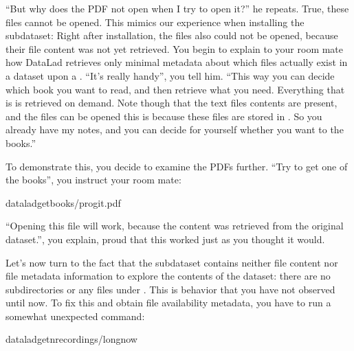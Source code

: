 \ignorespaces 
\sphinxAtStartPar
“But why does the PDF not open when I try to open it?” he repeats.
True, these files cannot be opened. This mimics our experience when
installing the  subdataset: Right after installation,
the  files also could not be opened, because their file
content was not yet retrieved. You begin to explain to your room mate
how DataLad retrieves only minimal metadata about which files actually
exist in a dataset upon a . “It’s really handy”,
you tell him. “This way you can decide which book you want to read,
and then retrieve what you need. Everything that is  is retrieved
on demand. Note though that the text files
contents are present, and the files can be opened \textendash{} this is because
these files are stored in {\hyperref[\detokenize{glossary:term-Git}]{}}. So you already have my notes,
and you can decide for yourself whether you want to  the books.”

\sphinxAtStartPar
To demonstrate this, you decide to examine the PDFs further.
“Try to get one of the books”, you instruct your room mate:

\begin{sphinxVerbatim}[commandchars=\\\{\}]
dataladgetbooks/progit.pdf
\end{sphinxVerbatim}

\sphinxAtStartPar
“Opening this file will work, because the content was retrieved from
the original dataset.”, you explain, proud that this worked just as you
thought it would.

\sphinxAtStartPar
Let’s now turn to the fact that the subdataset  contains neither
file content nor file metadata information to explore the contents of the
dataset: there are no subdirectories or any files under .
This is behavior that you have not observed until now.
To fix this and obtain file availability metadata,
you have to run a somewhat unexpected command:

\begin{sphinxVerbatim}[commandchars=\\\{\}]
dataladget\PYGZhy{}nrecordings/longnow
\end{sphinxVerbatim}

